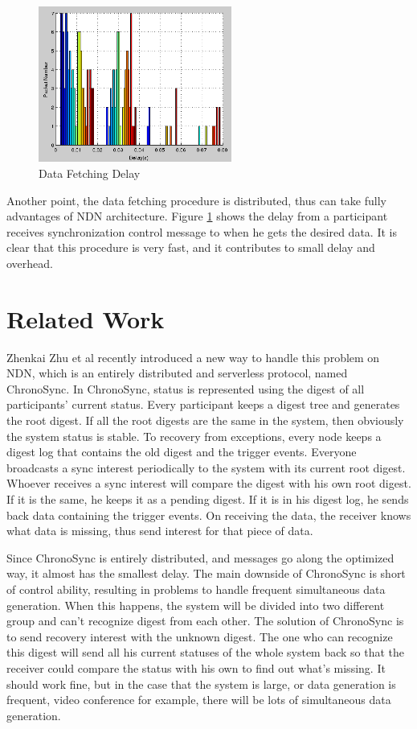 \documentclass[conference]{IEEEtran}
\begin{document}
\begin{figure}[!t]
\centering
\includegraphics[width=2.5in]{../png/data-fetch-delay.png}
\caption{Data Fetching Delay}
\label{data_fetch_delay}
\end{figure}
Another point, the data fetching procedure is distributed,
thus can take fully advantages of NDN architecture.
Figure \ref{data_fetch_delay} shows the delay from a participant
receives synchronization control message to when he gets the desired data.
It is clear that this procedure is very fast,
and it contributes to small delay and overhead.

\section{Related Work}
\label{related_work}
Zhenkai Zhu et al recently introduced a new way to handle this problem on NDN,
which is an entirely distributed and serverless protocol, named ChronoSync.
In ChronoSync, status is represented using the digest of all participants' current status.
Every participant keeps a digest tree and generates the root digest.
If all the root digests are the same in the system, then obviously the system status is stable.
To recovery from exceptions, every node keeps a digest log that contains the old digest and the trigger events.
Everyone broadcasts a sync interest periodically to the system with its current root digest.
Whoever receives a sync interest will compare the digest with his own root digest.
If it is the same, he keeps it as a pending digest.
If it is in his digest log, he sends back data containing the trigger events.
On receiving the data, the receiver knows what data is missing, thus send interest for that piece of data.

Since ChronoSync is entirely distributed,
and messages go along the optimized way, it almost has the smallest delay.
The main downside of ChronoSync is short of control ability,
resulting in problems to handle frequent simultaneous data generation.
When this happens, the system will be divided into two different group and can't recognize digest from each other.
The solution of ChronoSync is to send recovery interest with the unknown digest.
The one who can recognize this digest will send all his current statuses of the whole system back
so that the receiver could compare the status with his own to find out what's missing.
It should work fine, but in the case that the system is large,
or data generation is frequent, video conference for example,
there will be lots of simultaneous data generation.
\end{document}
